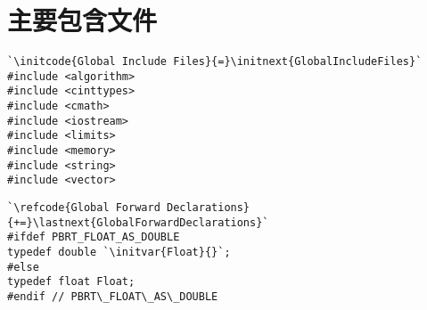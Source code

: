 \section{主要包含文件}\label{sec:主要包含文件}
\begin{lstlisting}
`\initcode{Global Include Files}{=}\initnext{GlobalIncludeFiles}`
#include <algorithm>
#include <cinttypes>
#include <cmath>
#include <iostream>
#include <limits>
#include <memory>
#include <string>
#include <vector>
\end{lstlisting}

\begin{lstlisting}
`\refcode{Global Forward Declarations}{+=}\lastnext{GlobalForwardDeclarations}`
#ifdef PBRT_FLOAT_AS_DOUBLE
typedef double `\initvar{Float}{}`;
#else
typedef float Float;
#endif // PBRT\_FLOAT\_AS\_DOUBLE
\end{lstlisting}